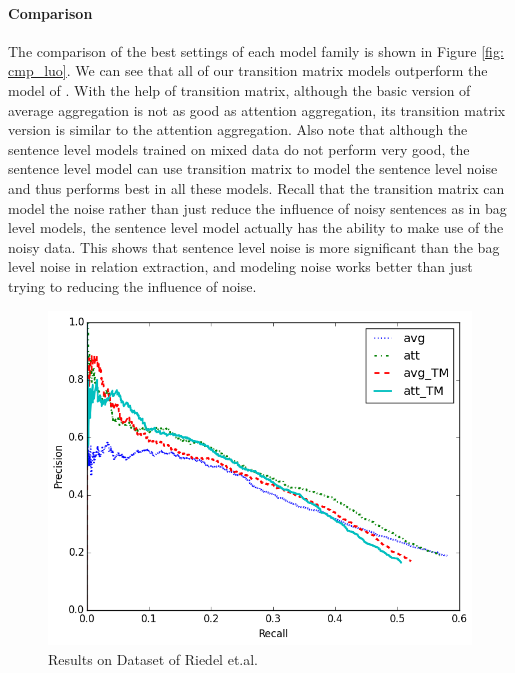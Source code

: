 \paragraph{Comparison} 
The comparison of the best settings of each model family is shown in Figure \ref{fig: cmp_luo}. We can see that all of our transition matrix models outperform the model of \cite{luo2016temporal}. With the help of transition matrix, although the basic version of average aggregation is not as good as attention aggregation, its transition matrix version is similar to the attention aggregation. Also note that although the sentence level models trained on mixed data do not perform very good, the sentence level model can use transition matrix to model the sentence level noise and thus performs best in all these models. Recall that the transition matrix can model the noise rather than just reduce the influence of noisy sentences as in bag level models, the sentence level model actually has the ability to make use of the noisy data. This shows that sentence level noise is more significant than the bag level noise in relation extraction, and modeling noise works better than just trying to reducing the influence of noise.


\begin{figure}[htbp]
\includegraphics[width=0.9\linewidth]{figures/re_att_avg_cmp_exp.png}
\caption{Results on Dataset of Riedel et.al.} 
\label{fig: Riedel_res}
\end{figure}

